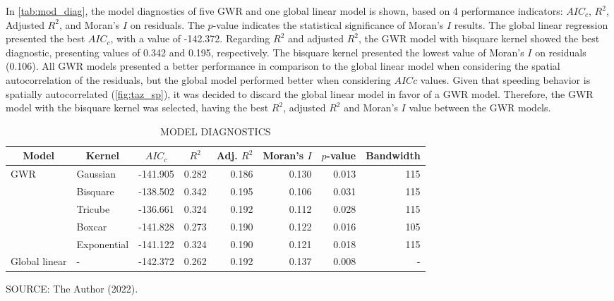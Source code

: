 In \autoref{tab:mod_diag}, the model diagnostics of five GWR and one global linear model is shown, based on 4 performance indicators: $AIC_c$, $R^2$, Adjusted $R^2$, and Moran's $I$ on residuals. The $p$-value indicates the statistical significance of Moran's $I$ results. The global linear regression presented the best $AIC_c$, with a value of -142.372. Regarding $R^2$ and adjusted $R^2$, the GWR model with bisquare kernel showed the best diagnostic, presenting values of 0.342 and 0.195, respectively. The bisquare kernel presented the lowest value of Moran's $I$ on residuals (0.106). All GWR models presented a better performance in comparison to the global linear model when considering the spatial autocorrelation of the residuals, but the global model performed better when considering $AICc$ values. Given that speeding behavior is spatially autocorrelated (\autoref{fig:taz_sp}), it was decided to discard the global linear model in favor of a GWR model. Therefore, the GWR model with the bisquare kernel was selected, having the best $R^2$, adjusted $R^2$ and Moran's $I$ value between the GWR models.

\begin{table}[!htbp]
    \footnotesize
    \captionsetup{justification=raggedright,
        singlelinecheck=false,
        font=footnotesize}
    \caption{MODEL DIAGNOSTICS}
    \centering
    \begin{tabular}{llrrrrrr}
        \hline
        \multicolumn{1}{c}{\textbf{Model}} & \multicolumn{1}{c}{\textbf{Kernel}} & \multicolumn{1}{c}{\textbf{$AIC_c$}} & \multicolumn{1}{c}{\textbf{$R^2$}} &
        \multicolumn{1}{c}{\textbf{Adj. $R^2$}} & \multicolumn{1}{c}{\textbf{Moran's $I$}} & \multicolumn{1}{c}{\textbf{$p$-value}} & \multicolumn{1}{c}{\textbf{Bandwidth}} \\
        \hline
        GWR & Gaussian    & -141.905 & 0.282 & 0.186 & 0.130 & 0.013 & 115 \\
            & Bisquare    & -138.502 & 0.342 & 0.195 & 0.106 & 0.031 & 115 \\
            & Tricube     & -136.661 & 0.324 & 0.192 & 0.112 & 0.028 & 115 \\
            & Boxcar      & -141.828 & 0.273 & 0.190 & 0.122 & 0.016 & 105 \\
            & Exponential & -141.122 & 0.324 & 0.190 & 0.121 & 0.018 & 115 \\
        Global linear & - & -142.372 & 0.262 & 0.192 & 0.137 & 0.008 & -   \\
        \hline
    \end{tabular}
    \label{tab:mod_diag}
    \par \vspace{2mm} \footnotesize \raggedright
    SOURCE: The Author (2022).
\end{table}

